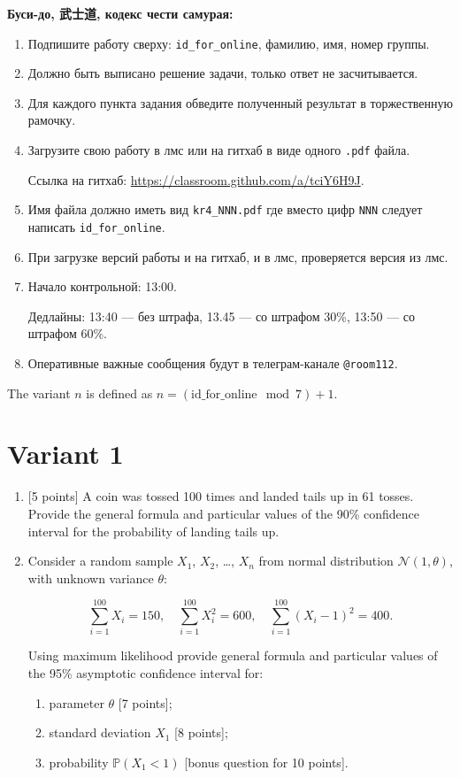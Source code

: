 \documentclass[12pt]{article}
\def \cN{\mathcal{N}}
\def \P{\mathbb{P}}
\newcommand \id {\mathrm{id}\_\mathrm{for}\_\mathrm{online}}
\begin{document}
\textbf{Буси-до, 武士道, кодекс чести самурая:}

\vspace{5mm}

\begin{enumerate}
\item Подпишите работу сверху: \verb|id_for_online|, фамилию, имя, номер группы.
\item Должно быть выписано решение задачи, только ответ не засчитывается.
\item Для каждого пункта задания обведите полученный результат в торжественную рамочку.
\item Загрузите свою работу в лмс или на гитхаб в виде одного \verb|.pdf| файла.

Ссылка на гитхаб: \url{https://classroom.github.com/a/tciY6H9J}.
\item Имя файла должно иметь вид \verb|kr4_NNN.pdf| где вместо цифр \verb|NNN| следует написать \verb|id_for_online|.
\item При загрузке версий работы и на гитхаб, и в лмс, проверяется версия из лмс. 
\item Начало контрольной: 13:00. 

Дедлайны: 13:40 — без штрафа, 13.45 — со штрафом 30\%, 13:50 — со штрафом 60\%.
\item Оперативные важные сообщения будут в телеграм-канале \verb|@room112|.
\end{enumerate}



\newpage

The variant $n$ is defined as $n=(\id \mod 7)+1$. 


\section*{Variant 1}
\begin{enumerate}

\item {[5 points]} A coin was tossed 100 times and landed tails up in 61 tosses.
Provide the general formula and particular values
of the 90\% confidence interval for the probability of landing tails up.

\item Consider a random sample $X_1$, $X_2$, \ldots, $X_n$ from normal distribution $\cN(1, \theta)$, 
with unknown variance $\theta$:

\[
\sum_{i=1}^{100} X_i = 150, \quad \sum_{i=1}^{100} X_i^2 = 600, \quad \sum_{i=1}^{100} (X_i - 1)^2 = 400.  
\]

Using maximum likelihood 
provide general formula and particular values
of the 95\% asymptotic confidence interval for:

\begin{enumerate}
  \item parameter $\theta$ {[7 points]};
  \item standard deviation $X_1$ {[8 points]};
  \item probability $\P(X_1 < 1)$ {[bonus question for 10 points]}.
\end{enumerate}

\end{enumerate}
\end{document}
